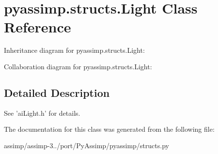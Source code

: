 \hypertarget{classpyassimp_1_1structs_1_1_light}{\section{pyassimp.\+structs.\+Light Class Reference}
\label{classpyassimp_1_1structs_1_1_light}
}


Inheritance diagram for pyassimp.\+structs.\+Light\+:


Collaboration diagram for pyassimp.\+structs.\+Light\+:


\subsection{Detailed Description}
\begin{DoxyVerb}See 'aiLight.h' for details.
\end{DoxyVerb}
 

The documentation for this class was generated from the following file\+:\begin{DoxyCompactItemize}
\item 
assimp/assimp-\/3../port/\+Py\+Assimp/pyassimp/structs.\+py\end{DoxyCompactItemize}
